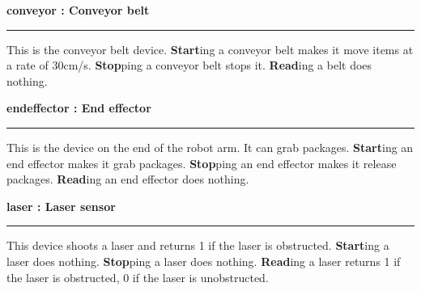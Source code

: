 \Huge\bfseries conveyor : \large Conveyor belt\par
\noindent\rule{ \textwidth }{2pt}\par
\vspace{ 0.5cm }
\mdseries\normalsize This is the conveyor belt device. \textbf{Start}ing a conveyor belt makes it move items at a rate of 30cm/s. \textbf{Stop}ping a conveyor belt stops it. \textbf{Read}ing a belt does nothing.

\pagebreak

\Huge\bfseries endeffector : \large End effector\par
\noindent\rule{ \textwidth }{2pt}\par
\vspace{ 0.5cm }
\mdseries\normalsize This is the device on the end of the robot arm. It can grab packages. \textbf{Start}ing an end effector makes it grab packages. \textbf{Stop}ping an end effector makes it release packages. \textbf{Read}ing an end effector does nothing.

\pagebreak

\Huge\bfseries laser : \large Laser sensor\par
\noindent\rule{ \textwidth }{2pt}\par
\vspace{ 0.5cm }
\mdseries\normalsize This device shoots a laser and returns 1 if the laser is obstructed. \textbf{Start}ing a laser does nothing. \textbf{Stop}ping a laser does nothing. \textbf{Read}ing a laser returns 1 if the laser is obstructed, 0 if the laser is unobstructed.

\pagebreak